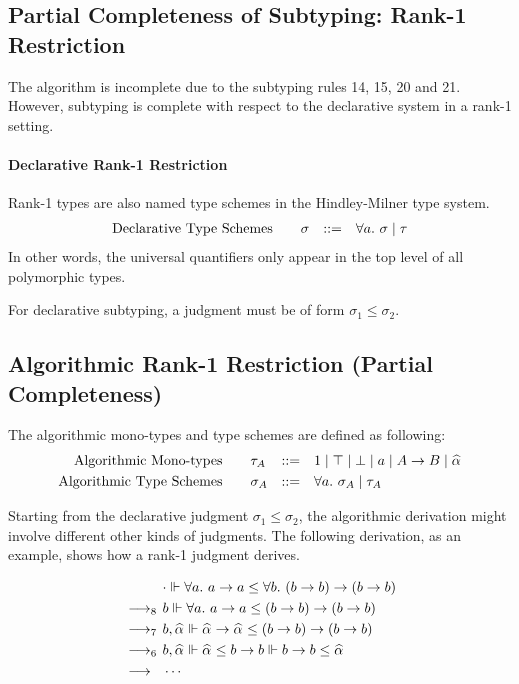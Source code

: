 \subsection{Partial Completeness of Subtyping: Rank-1 Restriction}

The algorithm is incomplete due to the subtyping rules 14, 15, 20 and 21.
However, subtyping is complete with respect to the declarative system in a rank-1 setting.

\paragraph{Declarative Rank-1 Restriction}

Rank-1 types are also named type schemes in the Hindley-Milner type system.
$$\begin{aligned}
    \text{Declarative Type Schemes}\qquad&\sigma &::=&\quad \all \sigma \mid \tau\\
\end{aligned}$$
In other words, the universal quantifiers only appear in the top level
of all polymorphic types.

For declarative subtyping, a judgment must be of form $\sigma_1 \le \sigma_2$.

\subsection{Algorithmic Rank-1 Restriction (Partial Completeness)}

The algorithmic mono-types and type schemes are defined as following:
$$\begin{aligned}
    \text{Algorithmic Mono-types}\qquad&\tau_A &::=&\quad
        1 \mid \top \mid \bot \mid a \mid A\to B \mid \al\\
    \text{Algorithmic Type Schemes}\qquad&\sigma_A &::=&\quad \all \sigma_A \mid \tau_A\\
\end{aligned}$$

Starting from the declarative judgment $\sigma_1 \le \sigma_2$,
the algorithmic derivation might involve different other kinds of judgments.
The following derivation, as an example, shows how a rank-1 judgment derives.

$$\begin{aligned}
           & \cdot \Vdash \all a \to a \le \all[b] (b \to b) \to (b \to b)\\
    \rrule{8} & b \Vdash \all a \to a \le (b \to b) \to (b \to b)\\
    \rrule{7} & b, \al \Vdash \al \to \al \le (b \to b) \to (b \to b)\\
    \rrule{6} & b, \al \Vdash \al \le b \to b \Vdash b \to b \le \al\\
    \rrule{} & \cdots
\end{aligned}$$

